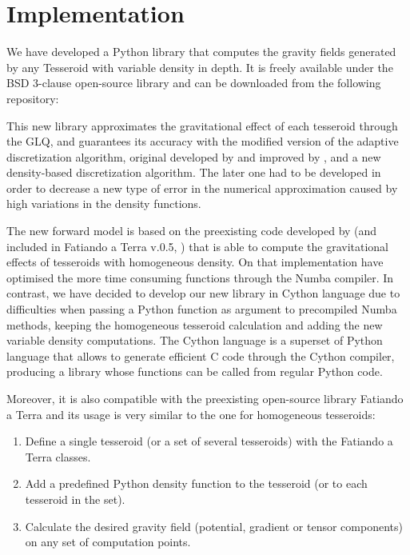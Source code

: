 \documentclass[extra]{gji}
\begin{document}

\section{Implementation}

We have developed a Python library that computes the gravity fields generated by any Tesseroid with variable density in depth.
It is freely available under the BSD 3-clause open-source library and can be downloaded from the following repository: 

This new library approximates the gravitational effect of each tesseroid through the GLQ, and guarantees its accuracy with the modified version of the adaptive discretization algorithm, original developed by \citet{Li2011} and improved by \citet{Uieda2016}, and a new density-based discretization algorithm.
The later one had to be developed in order to decrease a new type of error in the numerical approximation caused by high variations in the density functions.

The new forward model is based on the preexisting code developed by \citet{Uieda2016} (and included in Fatiando a Terra v.0.5, \citet{Uieda2013}) that is able to compute the gravitational effects of tesseroids with homogeneous density.
On that implementation \citet{Uieda2016} have optimised the more time consuming functions through the Numba compiler.
In contrast, we have decided to develop our new library in Cython language due to difficulties when passing a Python function as argument to precompiled Numba methods, keeping the homogeneous tesseroid calculation and adding the new variable density computations.
The Cython language is a superset of Python language that allows to generate efficient C code through the Cython compiler, producing a library whose functions can be called from regular Python code.

Moreover, it is also compatible with the preexisting open-source library Fatiando a Terra and its usage is very similar to the one for homogeneous tesseroids:

\begin{enumerate}
\renewcommand{\theenumi}{(\arabic{enumi})}
    \item Define a single tesseroid (or a set of several tesseroids) with the Fatiando a Terra classes.
    \item Add a predefined Python density function to the tesseroid (or to each tesseroid in the set).
    \item Calculate the desired gravity field (potential, gradient or tensor components) on any set of computation points.
\end{enumerate}
\end{document}
